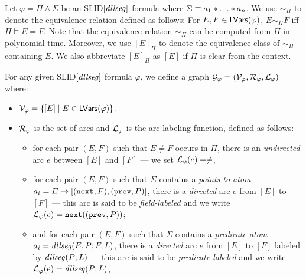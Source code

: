 \documentclass{llncs}
\newcommand{\tl}[1]{\color{blue} {TL: #1 :LT} \color{black}}
\begin{document}
Let $\varphi = \Pi \wedge \Sigma$ be an SLID$[\mathit{dllseg}]$ formula where $\Sigma \equiv a_1 \sep \dots \sep a_n$. We use $\sim_\Pi$ to denote the equivalence relation defined as follows: For $E,F \in \mathsf{LVars}(\varphi)$, $E \sim_\Pi F$ iff $\Pi \models E = F$. Note that the equivalence relation $\sim_\Pi$ can be computed from $\Pi$ in polynomial time. Moreover, we use $[E]_\Pi$ to denote the equivalence class of $\sim_\Pi$ containing $E$. We also abbreviate $[E]_\Pi$ as $[E]$ if $\Pi$ is clear from the context.


\begin{definition}%
For any given SLID$[\mathit{dllseg}]$ formula $\varphi$, we define a graph
 $\mathcal{G}_\varphi=(\mathcal{V}_\varphi, \mathcal{R}_\varphi,   \mathcal{L}_{\varphi})$ where:

\begin{itemize}
\item $\mathcal{V}_\varphi = \{[E] \mid E \in \mathsf{LVars}(\varphi)\}$.



\item  $\mathcal{R}_\varphi$ is the set of arcs and $\mathcal{L}_{\varphi}$ is the arc-labeling function, defined as follows:
\begin{itemize}
\item for each pair $(E, F)$ such that $E \neq F$ occurs in $\Pi$, there is an \emph{undirected} arc $e$ between $[E]$ and $[F]$ --- we set $\mathcal{L}_{\varphi}(e) =\neq$,
%
\item for each pair $(E,F)$ such that $\Sigma$ contains a \emph{points-to atom} $a_i=E \mapsto [(\mathtt{next},F), (\mathtt{prev},P)]$, there is a \emph{directed} arc $e$ from $[E]$ to $[F]$ --- this arc is said to be \emph{field-labeled} and we write $\mathcal{L}_{\varphi}(e)= \mathtt{next}((\mathtt{prev},P))$;

%
\item and for each pair $(E,F)$ such that $\Sigma$ contains a \emph{predicate atom} $a_i=\mathit{dllseg}(E, P;F, L)$, there is a \emph{directed} arc $e$ from $[E]$ to $[F]$ labeled by $\mathit{dllseg}(P; L)$  --- this arc is said to be \emph{predicate-labeled}  and we write $\mathcal{L}_{\varphi}(e)= \mathit{dllseg}(P;L)$, \end{itemize}
\end{itemize}
\end{definition}
\end{document}
